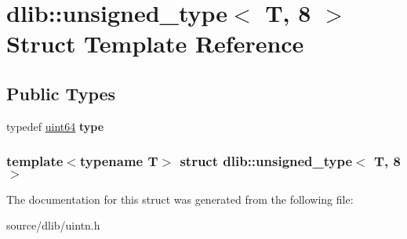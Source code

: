 \hypertarget{structdlib_1_1unsigned__type_3_01T_00_018_01_4}{
\section{dlib::unsigned\_\-type$<$ T, 8 $>$ Struct Template Reference}
\label{structdlib_1_1unsigned__type_3_01T_00_018_01_4}
}
\subsection*{Public Types}
\begin{DoxyCompactItemize}
\item 
\hypertarget{structdlib_1_1unsigned__type_3_01T_00_018_01_4_ab82a5b3135e4a9f41a8ddf7cd5a5df07}{
typedef \hyperlink{namespacedlib_a61113f8b6b3e4ccb66deca9355c8f65d}{uint64} {\bfseries type}}
\label{structdlib_1_1unsigned__type_3_01T_00_018_01_4_ab82a5b3135e4a9f41a8ddf7cd5a5df07}

\end{DoxyCompactItemize}
\subsubsection*{template$<$typename T$>$ struct dlib::unsigned\_\-type$<$ T, 8 $>$}



The documentation for this struct was generated from the following file:\begin{DoxyCompactItemize}
\item 
source/dlib/uintn.h\end{DoxyCompactItemize}
